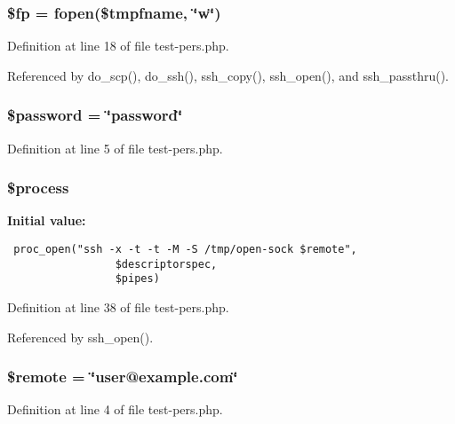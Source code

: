 \subsubsection{\setlength{\rightskip}{0pt plus 5cm}\$fp = fopen(\$tmpfname, \char`\"{}w\char`\"{})}\label{test-pers_8php_a5}




Definition at line 18 of file test-pers.php.

Referenced by do\_\-scp(), do\_\-ssh(), ssh\_\-copy(), ssh\_\-open(), and ssh\_\-passthru().
\subsubsection{\setlength{\rightskip}{0pt plus 5cm}\$password = \char`\"{}password\char`\"{}}\label{test-pers_8php_a2}




Definition at line 5 of file test-pers.php.
\subsubsection{\setlength{\rightskip}{0pt plus 5cm}\$process}\label{test-pers_8php_a9}


{\bf Initial value:}

\footnotesize\begin{verbatim} proc_open("ssh -x -t -t -M -S /tmp/open-sock $remote", 
                 $descriptorspec,
                 $pipes)
\end{verbatim}\normalsize 


Definition at line 38 of file test-pers.php.

Referenced by ssh\_\-open().
\subsubsection{\setlength{\rightskip}{0pt plus 5cm}\$remote = \char`\"{}user@example.com\char`\"{}}\label{test-pers_8php_a1}




Definition at line 4 of file test-pers.php.
